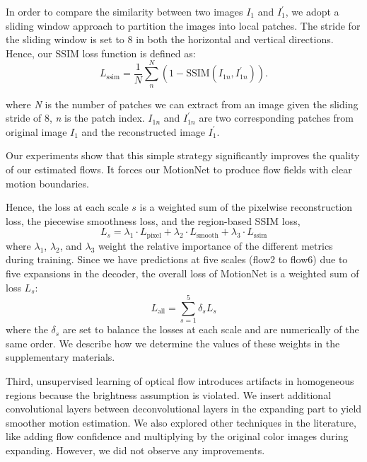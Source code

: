\documentclass[runningheads]{llncs}
\begin{document}
\begin{itemize}
{				In order to compare the similarity between two images $I_{1}$ and $I_{1}^{\prime}$, we adopt a sliding window approach to partition the images into local patches. The stride for the sliding window is set to $8$ in both the horizontal and vertical directions. Hence, our SSIM loss function is defined as: 
				\begin{equation}
					L_{\text{ssim}} = \frac{1}{N} \sum_{n}^{N} ( 1 - \text{SSIM} (I_{1n}, I_{1n}^{\prime}) ) .
					\label{eq:ssim_loss}
				\end{equation}
				
				where \textit{N} is the number of patches we can extract from an image given the sliding stride of $8$, \textit{n} is the patch index. $I_{1n}$ and $I_{1n}^{\prime}$ are two corresponding patches from original image $I_{1}$ and the reconstructed image $I_{1}^{\prime}$.}  
			Our experiments show that this simple strategy significantly improves the quality of our estimated flows. It forces our MotionNet to produce flow fields with clear motion boundaries.
		\end{itemize}
		
		{\color{black} Hence, the loss at each scale $s$} is a weighted sum of the pixelwise reconstruction loss, the piecewise smoothness loss, and the region-based SSIM loss, 
		\begin{equation}
			L_{s} = \lambda_{1} \cdot L_{\text{pixel}} + \lambda_{2} \cdot L_{\text{smooth}}  + \lambda_{3} \cdot L_{\text{ssim}}
			\label{eq:total_unsup_loss}
		\end{equation}
		where $\lambda_{1}$, $\lambda_{2}$, and $\lambda_{3}$ weight the relative importance of the different metrics during training. 
		{\color{black}Since we have predictions at five scales (flow2 to flow6) due to five expansions in the decoder, the overall loss of MotionNet is a weighted sum of loss $L_{s}$: 
			\begin{equation}
				L_{\text{all}} = \sum_{s=1}^{5} \delta_{s} L_{s}
				\label{eq:scale_unsup_loss}
			\end{equation}
			where the $\delta_{s}$ are set to balance the losses at each scale and are numerically of the same order.} We describe how we determine the values of these weights in the supplementary materials.
		
		Third, unsupervised learning of optical flow introduces artifacts in homogeneous regions because the brightness assumption is violated. We insert additional convolutional layers between deconvolutional layers in the expanding part to yield smoother motion estimation.  We also explored other techniques in the literature, like adding flow confidence and multiplying by the original color images \cite{flownet2} during expanding. However, we did not observe any improvements. 
		
\end{document}
